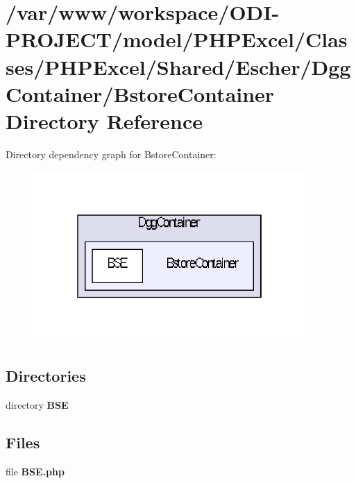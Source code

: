 \section{/var/www/workspace/\+O\+D\+I-\/\+P\+R\+O\+J\+E\+C\+T/model/\+P\+H\+P\+Excel/\+Classes/\+P\+H\+P\+Excel/\+Shared/\+Escher/\+Dgg\+Container/\+Bstore\+Container Directory Reference}
\label{dir_f57656c2e383c27833d977ca1a63b7ce}
Directory dependency graph for Bstore\+Container\+:\nopagebreak
\begin{figure}[H]
\begin{center}
\leavevmode
\includegraphics[width=294pt]{dir_f57656c2e383c27833d977ca1a63b7ce_dep}
\end{center}
\end{figure}
\subsection*{Directories}
\begin{DoxyCompactItemize}
\item 
directory {\bf B\+S\+E}
\end{DoxyCompactItemize}
\subsection*{Files}
\begin{DoxyCompactItemize}
\item 
file {\bfseries B\+S\+E.\+php}
\end{DoxyCompactItemize}
